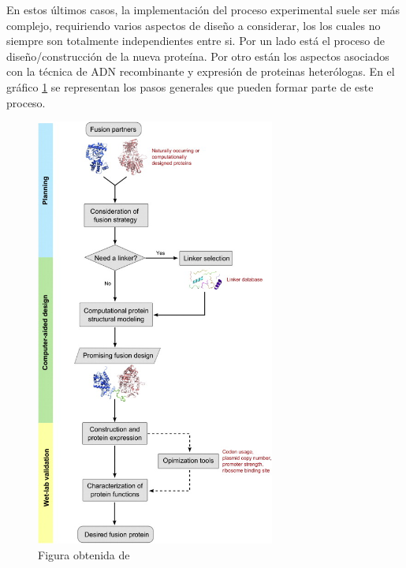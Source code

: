 % 


En estos últimos casos, la implementación del proceso experimental suele ser más complejo, requiriendo varios aspectos de diseño a considerar, los 
los cuales no siempre son totalmente independientes entre si. 
Por un lado está el proceso de diseño/construcción de la nueva proteína.
Por otro están los aspectos asociados con la técnica de ADN recombinante y expresión de proteinas heterólogas. 
En el gráfico \ref{esquemaProcesoFusion} se representan los pasos generales que pueden formar parte de este proceso.

\begin{figure}[htbp]
\centering
\includegraphics[width=0.7\textwidth]{img/esquemaProcesoFusion.jpg} 
\caption{Figura obtenida de \cite{yu2015synthetic}}
\label{esquemaProcesoFusion}
\end{figure}

